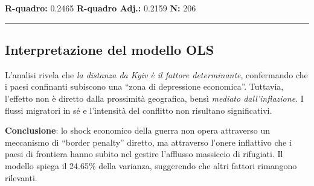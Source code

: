 \documentclass[
  letterpaper,
  DIV=11,
  numbers=noendperiod]{scrartcl}
\begin{document}
\vspace{0.2cm}
\scriptsize

\textbf{R-quadro:} 0.2465 \quad \textbf{R-quadro Adj.:} 0.2159 \quad
\textbf{N:} 206

\begin{center}\rule{0.5\linewidth}{0.5pt}\end{center}

\subsection{Interpretazione del modello
OLS}\label{interpretazione-del-modello-ols}

L'analisi rivela che \emph{la distanza da Kyiv è il fattore
determinante}, confermando che i paesi confinanti subiscono una ``zona
di depressione economica''. Tuttavia, l'effetto non è diretto dalla
prossimità geografica, bensì \emph{mediato dall'inflazione}. I flussi
migratori in sé e l'intensità del conflitto non risultano significativi.

\textbf{Conclusione}: lo shock economico della guerra non opera
attraverso un meccanismo di ``border penalty'' diretto, ma attraverso
l'onere inflattivo che i paesi di frontiera hanno subito nel gestire
l'afflusso massiccio di rifugiati. Il modello spiega il 24.65\% della
varianza, suggerendo che altri fattori rimangono rilevanti.
\end{document}

